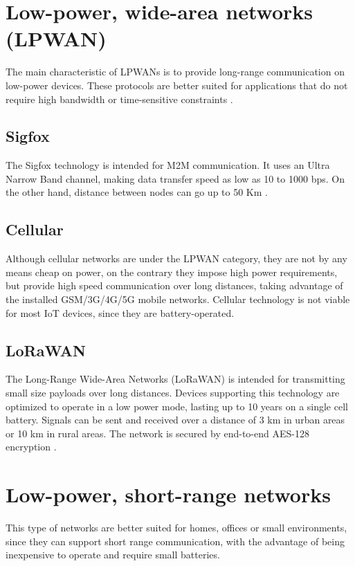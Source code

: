 \section{Low-power, wide-area networks (LPWAN)}
The main characteristic of LPWANs is to provide long-range communication on low-power devices. These protocols are better suited for applications that do not require high bandwidth or time-sensitive constraints \cite{BehrTech:protocols}.

\subsection{Sigfox}
The Sigfox technology is intended for M2M communication. It uses an Ultra Narrow Band channel, making data transfer speed as low as 10 to 1000 bps. On the other hand, distance between nodes can go up to 50 Km \cite{IEEE:protocols}.

\subsection{Cellular}
Although cellular networks are under the LPWAN category, they are not by any means cheap on power, on the contrary they impose high power requirements, but provide high speed communication over long distances, taking advantage of the installed GSM/3G/4G/5G mobile networks. Cellular technology is not viable for most IoT devices, since they are battery-operated.

\subsection{LoRaWAN}
The Long-Range Wide-Area Networks (LoRaWAN) is intended for transmitting small size payloads over long distances. Devices supporting this technology are optimized to operate in a low power mode, lasting up to 10 years on a single cell battery. Signals can be sent and received over a distance of 3 km in urban areas or 10 km in rural areas. The network is secured by end-to-end AES-128 encryption \cite{LoRaWAN}.

\section{Low-power, short-range networks}
This type of networks are better suited for homes, offices or small environments, since they can support short range communication, with the advantage of being inexpensive to operate and require small batteries.

